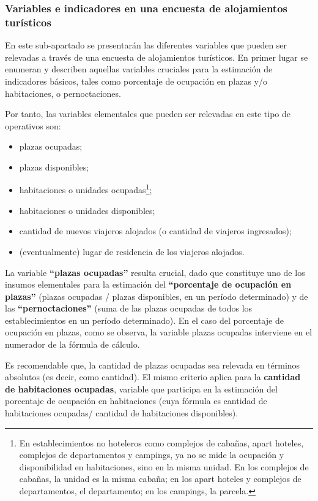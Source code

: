 \documentclass[
]{book}
\begin{document}
\hypertarget{variables-e-indicadores-en-una-encuesta-de-alojamientos-turuxedsticos}{%
\subsubsection{Variables e indicadores en una encuesta de alojamientos turísticos}\label{variables-e-indicadores-en-una-encuesta-de-alojamientos-turuxedsticos}}

En este sub-apartado se presentarán las diferentes variables que pueden ser relevadas a través de una encuesta de alojamientos turísticos. En primer lugar se enumeran y describen aquellas variables cruciales para la estimación de indicadores básicos, tales como porcentaje de ocupación en plazas y/o habitaciones, o pernoctaciones.

Por tanto, las variables elementales que pueden ser relevadas en este tipo de operativos son:

\begin{itemize}
\item
  plazas ocupadas;
\item
  plazas disponibles;
\item
  habitaciones o unidades ocupadas\footnote{En establecimientos no hoteleros como complejos de cabañas, apart hoteles, complejos de departamentos y campings, ya no se mide la ocupación y disponibilidad en habitaciones, sino en la misma unidad. En los complejos de cabañas, la unidad es la misma cabaña; en los apart hoteles y complejos de departamentos, el departamento; en los campings, la parcela.};
\item
  habitaciones o unidades disponibles;
\item
  cantidad de nuevos viajeros alojados (o cantidad de viajeros ingresados);
\item
  (eventualmente) lugar de residencia de los viajeros alojados.
\end{itemize}

La variable \textbf{``plazas ocupadas''} resulta crucial, dado que constituye uno de los insumos elementales para la estimación del \textbf{``porcentaje de ocupación en plazas''} (plazas ocupadas / plazas disponibles, en un período determinado) y de las \textbf{``pernoctaciones''} (suma de las plazas ocupadas de todos los establecimientos en un período determinado). En el caso del porcentaje de ocupación en plazas, como se observa, la variable plazas ocupadas interviene en el numerador de la fórmula de cálculo.

Es recomendable que, la cantidad de plazas ocupadas sea relevada en términos absolutos (es decir, como cantidad). El mismo criterio aplica para la \textbf{cantidad de habitaciones ocupadas}, variable que participa en la estimación del porcentaje de ocupación en habitaciones (cuya fórmula es cantidad de habitaciones ocupadas/ cantidad de habitaciones disponibles).
\end{document}
